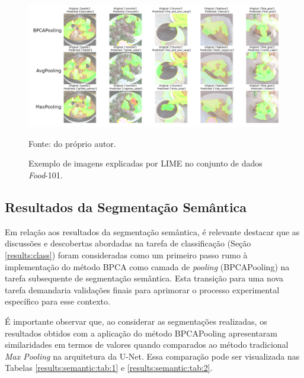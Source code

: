 \begin{figure}[H]
    \centering
    \caption[LIME no \textit{Food}-101.]{Exemplo de imagens explicadas por LIME no conjunto de dados \textit{Food}-101.}
    \label{results:fig:datasets:9}
    \includegraphics[width=1\textwidth]{recursos/imagens/results/lime_explanations_food.png}

    Fonte: do próprio autor.
\end{figure}


\subsection{Resultados da Segmentação Semântica}
\label{results:semantic}
Em relação aos resultados da segmentação semântica, é relevante destacar que as discussões e descobertas abordadas na tarefa de classificação (Seção \ref{results:class}) foram consideradas como um primeiro passo rumo à implementação do método BPCA como camada de \textit{pooling} (BPCAPooling) na tarefa subsequente de segmentação semântica. Esta transição para uma nova tarefa demandaria validações finais para aprimorar o processo experimental específico para esse contexto.

É importante observar que, ao considerar as segmentações realizadas, os resultados obtidos com a aplicação do método BPCAPooling apresentaram similaridades em termos de valores quando comparados ao método tradicional \textit{Max Pooling} na arquitetura da U-Net. Essa comparação pode ser visualizada nas Tabelas \ref{results:semantic:tab:1} e \ref{results:semantic:tab:2}.

